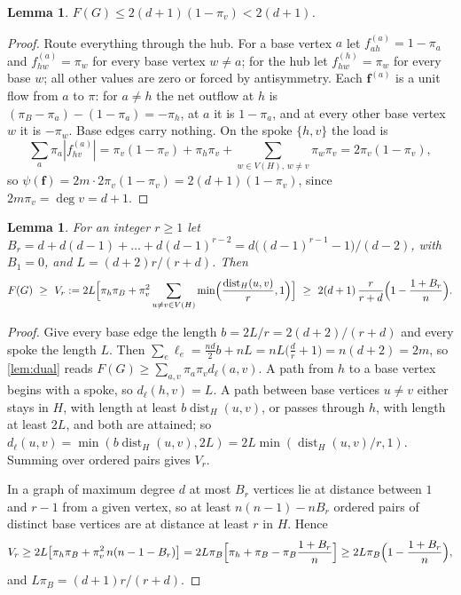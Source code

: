 \documentclass[11pt]{amsart}
\newtheorem{lemma}[theorem]{Lemma}
\theoremstyle{definition}
\newcommand{\bfF}{\mathbf{f}}
\DeclareMathOperator{\dist}{dist}
\begin{document}
\begin{lemma}\label{lem:hub}
$F(G)\le2(d+1)(1-\pi_v)<2(d+1)$.
\end{lemma}

\begin{proof}
Route everything through the hub. For a base vertex $a$ let $f^{(a)}_{ah}=1-\pi_a$ and $f^{(a)}_{hw}=\pi_w$ for every base vertex $w\ne a$; for the hub let $f^{(h)}_{hw}=\pi_w$ for every base $w$; all other values are zero or forced by antisymmetry. Each $\bfF^{(a)}$ is a unit flow from $a$ to $\pi$: for $a\ne h$ the net outflow at $h$ is $(\pi_B-\pi_a)-(1-\pi_a)=-\pi_h$, at $a$ it is $1-\pi_a$, and at every other base vertex $w$ it is $-\pi_w$. Base edges carry nothing. On the spoke $\{h,v\}$ the load is
\[
\sum_a\pi_a|f^{(a)}_{hv}|=\pi_v(1-\pi_v)+\pi_h\pi_v+\sum_{w\in V(H),\,w\ne v}\pi_w\pi_v=2\pi_v(1-\pi_v),
\]
so $\psi(\bfF)=2m\cdot2\pi_v(1-\pi_v)=2(d+1)(1-\pi_v)$, since $2m\pi_v=\deg v=d+1$.
\end{proof}

\begin{lemma}\label{lem:cert}
For an integer $r\ge1$ let $B_r=d+d(d-1)+\dots+d(d-1)^{r-2}=d\bigl((d-1)^{r-1}-1\bigr)/(d-2)$, with $B_1=0$, and $L=(d+2)r/(r+d)$. Then
\begin{equation}\label{eq:Vr}
F(G)\ \ge\ V_r:=2L\Bigl[\pi_h\pi_B+\pi_v^2\sum_{u\ne v\in V(H)}\min\Bigl(\frac{\dist_H(u,v)}r,1\Bigr)\Bigr]
\ \ge\ 2(d+1)\,\frac r{r+d}\Bigl(1-\frac{1+B_r}n\Bigr).
\end{equation}
\end{lemma}

\begin{proof}
Give every base edge the length $b=2L/r=2(d+2)/(r+d)$ and every spoke the length $L$. Then $\sum_e\ell_e=\frac{nd}2b+nL=nL\bigl(\frac dr+1\bigr)=n(d+2)=2m$, so \cref{lem:dual} reads $F(G)\ge\sum_{a,v}\pi_a\pi_vd_\ell(a,v)$. A path from $h$ to a base vertex begins with a spoke, so $d_\ell(h,v)=L$. A path between base vertices $u\ne v$ either stays in $H$, with length at least $b\dist_H(u,v)$, or passes through $h$, with length at least $2L$, and both are attained; so $d_\ell(u,v)=\min(b\dist_H(u,v),2L)=2L\min(\dist_H(u,v)/r,1)$. Summing over ordered pairs gives $V_r$.

In a graph of maximum degree $d$ at most $B_r$ vertices lie at distance between $1$ and $r-1$ from a given vertex, so at least $n(n-1)-nB_r$ ordered pairs of distinct base vertices are at distance at least $r$ in $H$. Hence
\[
V_r\ge2L\bigl[\pi_h\pi_B+\pi_v^2\,n(n-1-B_r)\bigr]=2L\pi_B\Bigl[\pi_h+\pi_B-\pi_B\frac{1+B_r}n\Bigr]\ge2L\pi_B\Bigl(1-\frac{1+B_r}n\Bigr),
\]
and $L\pi_B=(d+1)r/(r+d)$.
\end{proof}
\end{document}
